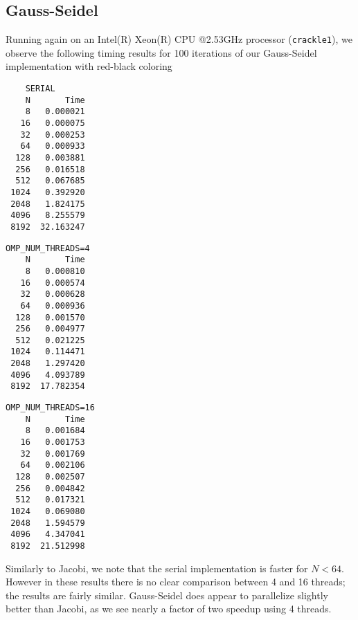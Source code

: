 \documentclass{article}
\begin{document}
\newpage
\subsection{Gauss-Seidel}
Running again on an Intel(R) Xeon(R) CPU @2.53GHz processor (\texttt{crackle1}),
we observe the following timing results for 100 iterations of our Gauss-Seidel
implementation with red-black coloring
\begin{multicols}{3}
  \begin{verbatim}
    SERIAL
    N       Time
    8   0.000021
   16   0.000075
   32   0.000253
   64   0.000933
  128   0.003881
  256   0.016518
  512   0.067685
 1024   0.392920
 2048   1.824175
 4096   8.255579
 8192  32.163247
 \end{verbatim}
 \columnbreak
 \begin{verbatim}
OMP_NUM_THREADS=4
    N       Time
    8   0.000810
   16   0.000574
   32   0.000628
   64   0.000936
  128   0.001570
  256   0.004977
  512   0.021225
 1024   0.114471
 2048   1.297420
 4096   4.093789
 8192  17.782354
 \end{verbatim}
 \columnbreak
\begin{verbatim}
OMP_NUM_THREADS=16
    N       Time
    8   0.001684
   16   0.001753
   32   0.001769
   64   0.002106
  128   0.002507
  256   0.004842
  512   0.017321
 1024   0.069080
 2048   1.594579
 4096   4.347041
 8192  21.512998
  \end{verbatim}
\end{multicols} \vspace{-1.5\baselineskip} Similarly to Jacobi, we note that the
serial implementation is faster for $N < 64$. However in these results there is
no clear comparison between 4 and 16 threads; the results are fairly similar.
Gauss-Seidel does appear to parallelize slightly better than Jacobi, as we see
nearly a factor of two speedup using 4 threads.
\end{document}
